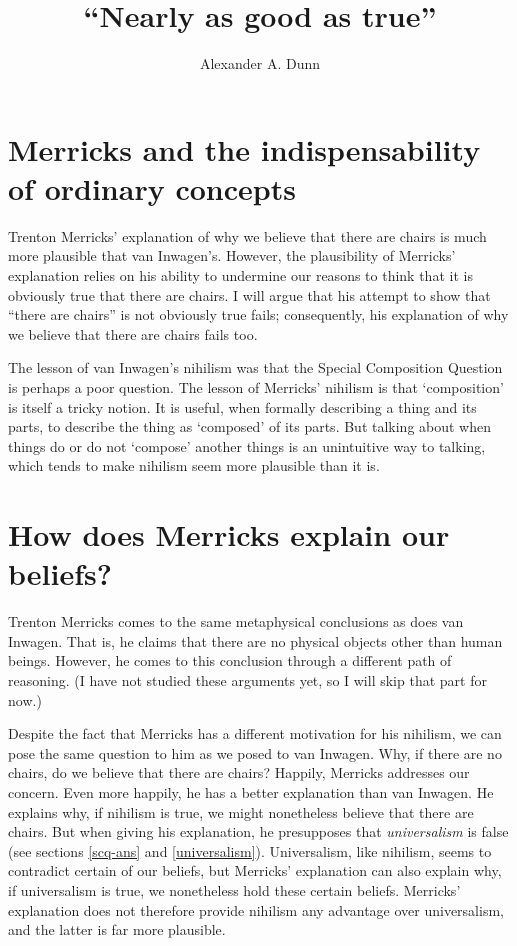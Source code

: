 \documentclass[11pt]{article}
\title{``Nearly as good as true''}
\author{Alexander A. Dunn}
\begin{document}
\ifstandalone
\maketitle
\begin{spacing}{1.25}
\fi

\section{Merricks and the indispensability of ordinary concepts}
\label{universe}

\noindent Trenton Merricks' explanation of why we believe that there
are chairs is much more plausible that van Inwagen's.  However, the
plausibility of Merricks' explanation relies on his ability to
undermine our reasons to think that it is obviously true that there
are chairs.  I will argue that his attempt to show that ``there are
chairs'' is not obviously true fails; consequently, his explanation of
why we believe that there are chairs fails too.  

The lesson of van Inwagen's nihilism was that the Special Composition
Question is perhaps a poor question.  The lesson of Merricks' nihilism
is that `composition' is itself a tricky notion.  It is useful, when
formally describing a thing and its parts, to describe the thing as
`composed' of its parts.  But talking about when things do or do not
`compose' another things is an unintuitive way to talking, which tends
to make nihilism seem more plausible than it is.

\section{How does Merricks explain our beliefs?}
\label{merricks}
Trenton Merricks comes to the same metaphysical conclusions as does
van Inwagen.  That is, he claims that there are no physical objects
other than human beings.  However, he comes to this conclusion through
a different path of reasoning.  (I have not studied these arguments
yet, so I will skip that part for now.)

Despite the fact that Merricks has a different motivation for his
nihilism, we can pose the same question to him as we posed to van
Inwagen.  Why, if there are no chairs, do we believe that there are
chairs?  Happily, Merricks addresses our concern.  Even more happily,
he has a better explanation than van Inwagen.  He explains why, if
nihilism is true, we might nonetheless believe that there are chairs.
But when giving his explanation, he presupposes that {\em
  universalism} is false (see sections \ref{scq-ans} and
\ref{universalism}).  Universalism, like nihilism, seems to contradict
certain of our beliefs, but Merricks' explanation can also explain
why, if universalism is true, we nonetheless hold these certain
beliefs.  Merricks' explanation does not therefore provide nihilism
any advantage over universalism, and the latter is far more plausible.


\end{spacing}
\end{document}
